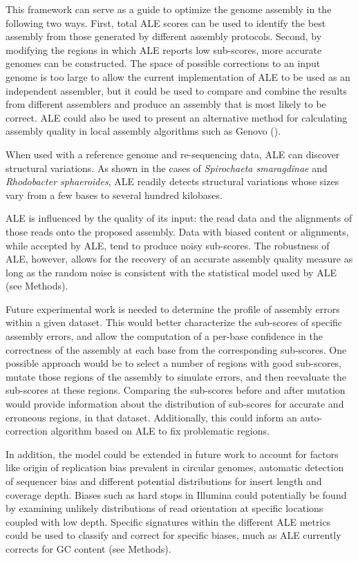 \documentclass[phd,tocprelim]{cornell}
\begin{document}
This framework can serve as a guide to optimize the genome assembly in the following two ways. First, total ALE scores can be used to identify the best assembly from those generated by different assembly protocols. Second, by modifying the regions in which ALE reports low sub-scores, more accurate genomes can be constructed. The space of possible corrections to an input genome is too large to allow the current implementation of ALE to be used as an independent assembler, but it could be used to compare and combine the results from different assemblers and produce an assembly that is most likely to be correct. ALE could also be used to present an alternative method for calculating assembly quality in local assembly algorithms such as Genovo (\cite{Laserson2011}).

When used with a reference genome and re-sequencing data, ALE can discover structural variations. As shown in the cases of {\it Spirochaeta smaragdinae} and {\it Rhodobacter sphaeroides}, ALE readily detects structural variations whose sizes vary from a few bases to several hundred kilobases.

ALE is influenced by the quality of its input: the read data and the alignments of those reads onto the proposed assembly. Data with biased content or alignments, while accepted by ALE, tend to produce noisy sub-scores. The robustness of ALE, however, allows for the recovery of an accurate assembly quality measure as long as the random noise is consistent with the statistical model used by ALE (see Methods).

Future experimental work is needed to determine the profile of assembly errors within a given dataset.  This would better characterize the sub-scores of specific assembly errors, and allow the computation of a per-base confidence in the correctness of the assembly at each base from the corresponding sub-scores.  One possible approach would be to select a number of regions with good sub-scores, mutate those regions of the assembly to simulate errors, and then reevaluate the sub-scores at these regions.  Comparing the sub-scores before and after mutation would provide information about the distribution of sub-scores for accurate and erroneous regions, in that dataset.  Additionally, this could inform an auto-correction algorithm based on ALE to fix problematic regions.

In addition, the model could be extended in future work to account for factors like origin of replication bias prevalent in circular genomes, automatic detection of sequencer bias and different potential distributions for insert length and coverage depth. Biases such as hard stops in Illumina could potentially be found by examining unlikely distributions of read orientation at specific locations coupled with low depth. Specific signatures within the different ALE metrics could be used to classify and correct for specific biases, much as ALE currently corrects for GC content (see Methods).
\end{document}
